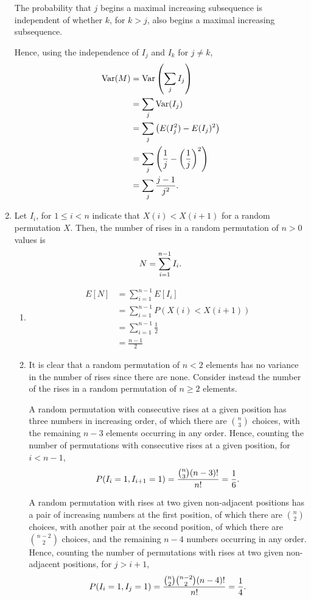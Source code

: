 \documentclass{article}
\DeclareMathOperator{\Var}{Var}
\begin{document}
\begin{enumerate}
    The probability that $j$ begins a maximal increasing subsequence is independent of whether
    $k$, for $k>j$, also begins a maximal increasing subsequence.

    Hence, using the independence of $I_j$ and $I_k$ for $j \neq k$,
    \[\begin{split}
    \Var(M) & = \Var\left(\sum_j{I_j}\right) \\
            & = \sum_j{\Var(I_j)} \\
            & = \sum_j\left(E(I_j^2) - E(I_j)^2\right) \\
            & = \sum_j{\left(\frac{1}{j} - \left(\frac{1}{j}\right)^2\right)} \\
            & = \sum_j{\frac{j-1}{j^2}}\text.
    \end{split}\]
\item
    Let $I_i$, for $1 \leq i < n$ indicate that $X(i) < X(i+1)$ for a random permutation $X$.
    Then, the number of rises in a random permutation of $n > 0$ values is
    \[ N = \sum_{i=1}^{n-1}{I_i}\text. \]
    \begin{enumerate}
    \item
        \[\begin{split}
        E[N]    & = \sum_{i=1}^{n-1}{E[I_i]} \\
                & = \sum_{i=1}^{n-1}{P(X(i) < X(i+1))} \\
                & = \sum_{i=1}^{n-1}\frac{1}{2} \\
                & = \frac{n-1}{2}
        \end{split}\]
    \item
        It is clear that a random permutation of $n < 2$ elements has no variance in the number of rises
        since there are none. Consider instead the number of the rises in a random permutation of $n \geq 2$ elements.

        A random permutation with consecutive rises at a given position has three numbers in increasing order,
        of which there are ${n \choose 3}$ choices, with the remaining $n-3$ elements occurring in any order.
        Hence, counting the number of permutations with consecutive rises at a given position, for $i < n-1$,
        \[P(I_i=1, I_{i+1}=1) = \frac{{n \choose 3} (n-3)!}{n!} = \frac{1}{6}\text.\]

        A random permutation with rises at two given non-adjacent positions has a pair of increasing numbers at
        the first position, of which there are ${n \choose 2}$ choices, with another pair at the second position,
        of which there are ${n-2 \choose 2}$ choices, and the remaining $n-4$ numbers occurring in any order.
        Hence, counting the number of permutations with rises at two given non-adjacent positions,
        for $j > i + 1$,
        \[P(I_i=1, I_j=1) = \frac{{n \choose 2}{n-2 \choose 2}(n-4)!}{n!} = \frac{1}{4}\text. \]


\end{enumerate}
\end{enumerate}
\end{document}
